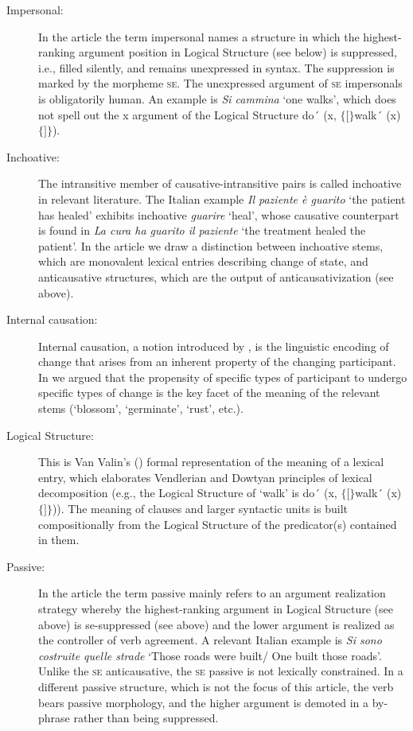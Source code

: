 \documentclass[output=paper,colorlinks,citecolor=brown
]{langscibook}
\begin{document}
\begin{description}
\item[Impersonal:]  In the article the term impersonal   names a structure in which the highest-ranking argument position in Logical   Structure (see below) is suppressed, i.e., filled silently, and remains   unexpressed in syntax. The suppression is marked by the morpheme \textsc{se}. The unexpressed argument of \textsc{se} impersonals is obligatorily human.  An example is \textit{Si cammina} ‘one   walks’, which does not spell out the x argument of the Logical Structure do´ (x, $\{ [ \}$walk´ (x) $\{ ] \}$).                    
\item[Inchoative:]  The intransitive member of   causative-intransitive pairs is called inchoative in relevant   literature. The Italian example \textit{Il paziente è guarito} ‘the patient has   healed’ exhibits inchoative \textit{guarire} ‘heal’, whose causative   counterpart is found in \textit{La cura ha guarito il paziente} ‘the treatment   healed the patient’. In the article we draw a distinction between inchoative stems,   which are monovalent lexical entries describing change of state, and anticausative   structures, which are the output of anticausativization (see above).     
\item[Internal   causation:]  Internal causation, a notion introduced   by \citet{levin1995unaccusativity}, is the linguistic encoding of change   that arises from an inherent property of the changing participant. In \citet{bentley2023internally} we argued that the propensity of specific types of participant to   undergo specific types of change is the key facet of the meaning of the   relevant stems (‘blossom’, ‘germinate’, ‘rust’, etc.).                               
\item[Logical   Structure:]  This is Van Valin's (\citeyear{vanvalin2005exploring,vanvalin2023principles}) formal   representation of the meaning of a lexical entry, which elaborates Vendlerian   and Dowtyan principles of lexical decomposition (e.g., the Logical Structure   of ‘walk’ is do´   (x,   $\{ [ \}$walk´ (x)$\{ ] \}$)). The meaning of clauses   and larger syntactic units is built compositionally from the Logical   Structure of the predicator(s) contained in them.                   
\item[Passive:]  In the article the term passive   mainly refers to an argument realization strategy whereby the highest-ranking   argument in Logical Structure (see above) is se-suppressed   (see above) and the lower argument is realized as the controller of verb   agreement. A relevant Italian example is \textit{Si sono costruite quelle strade}   ‘Those roads were built/ One built those roads’. Unlike the \textsc{se} anticausative, the \textsc{se} passive is not lexically   constrained. In a different passive structure, which is not the focus of this   article, the verb bears passive morphology, and the higher argument is   demoted in a by-phrase rather than being suppressed. 

\end{description}
\end{document}
